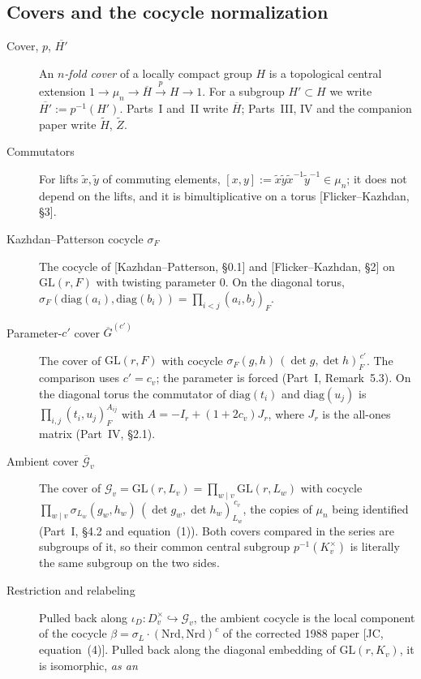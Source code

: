 \subsection{Covers and the cocycle normalization}\label{gl:cocycle}
\begin{description}
\item[Cover, $p$, $\overline{H'}$] An \emph{$n$-fold cover} of a
locally compact group $H$ is a topological central extension
$1\to\mu_n\to\overline H\xrightarrow{\ p\ }H\to1$.  For a subgroup
$H'\subset H$ we write $\overline{H'}:=p^{-1}(H')$.  Parts~I and~II
write $\overline H$; Parts~III, IV and the companion paper write
$\widetilde H$, $\widetilde Z$.
\item[Commutators] For lifts $\tilde x,\tilde y$ of commuting
elements, $[x,y]:=\tilde x\tilde y\tilde x^{-1}\tilde y^{-1}\in\mu_n$;
it does not depend on the lifts, and it is bimultiplicative on a
torus [Flicker--Kazhdan, \S3].
\item[Kazhdan--Patterson cocycle $\sigma_F$] The cocycle of
[Kazhdan--Patterson, \S0.1] and [Flicker--Kazhdan, \S2] on
$\mathrm{GL}(r,F)$ with twisting parameter $0$.  On the diagonal
torus,
$\sigma_F(\mathrm{diag}(a_i),\mathrm{diag}(b_i))=\prod_{i<j}(a_i,b_j)_F$.
\item[Parameter-$c'$ cover $\overline G^{(c')}$] The cover of
$\mathrm{GL}(r,F)$ with cocycle
$\sigma_F(g,h)\,(\det g,\det h)_F^{\,c'}$.  The comparison uses
$c'=c_v$; the parameter is forced (Part~I, Remark~5.3).  On the
diagonal torus the commutator of $\mathrm{diag}(t_i)$ and
$\mathrm{diag}(u_j)$ is $\prod_{i,j}(t_i,u_j)_F^{A_{ij}}$ with
$A=-I_r+(1+2c_v)J_r$, where $J_r$ is the all-ones matrix (Part~IV,
\S2.1).
\item[Ambient cover $\overline{\mathcal G}_v$] The cover of
$\mathcal G_v=\mathrm{GL}(r,L_v)=\prod_{w\mid v}\mathrm{GL}(r,L_w)$
with cocycle
$\prod_{w\mid v}\sigma_{L_w}(g_w,h_w)\,(\det g_w,\det h_w)_{L_w}^{\,c_v}$,
the copies of $\mu_n$ being identified (Part~I, \S4.2 and
equation~(1)).  Both covers compared in the series are subgroups of
it, so their common central subgroup $p^{-1}(K_v^\times)$ is literally
the same subgroup on the two sides.
\item[Restriction and relabeling] Pulled back along
$\iota_D:D_v^\times\hookrightarrow\mathcal G_v$, the ambient cocycle
is the local component of the cocycle
$\beta=\sigma_L\cdot(\mathrm{Nrd},\mathrm{Nrd})^c$ of the corrected
1988 paper [JC, equation~(4)].  Pulled back along the diagonal
embedding of $\mathrm{GL}(r,K_v)$, it is isomorphic, \emph{as an
}
\end{description}
